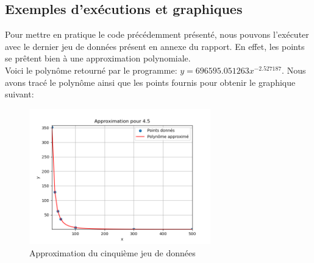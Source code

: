 \subsection{Exemples d'exécutions et graphiques}
Pour mettre en pratique le code précédemment présenté, nous pouvons l'exécuter avec le dernier jeu de données présent en annexe du rapport. En effet, les points se prêtent bien à une approximation polynomiale.\\
Voici le polynôme retourné par le programme: $y=696595.051263x^{-2.527187}$. Nous avons tracé le polynôme ainsi que les points fournis pour obtenir le graphique suivant:\\
\begin{figure}[H]
    \centering
    \includegraphics[width=0.7\textwidth]{sources/Corentin/approximationC/results/graphs/45.png}
    \caption{Approximation du cinquième jeu de données}
\end{figure}

